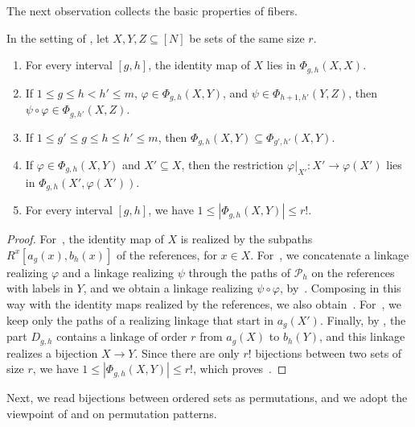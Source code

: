 \documentclass[fontsize=12pt,leading=14pt]{fullpaper}
\newcommand{\Pcal}{\mathcal{P}}
\begin{document}
The next observation collects the basic properties of fibers.

\begin{observation}\label{lem:s3-join-pairings}
  In the setting of , let $X,Y,Z\subseteq[N]$ be sets of the same size $r$.
  \begin{enumerate}[label=\textnormal{(\roman*)}]
    \item\label{item:s3-join-id} For every interval $[g,h]$, the identity map of $X$ lies in $\Phi_{g,h}(X,X)$.
    \item\label{item:s3-join-comp} If $1\le g\le h<h'\le m$, $\varphi\in\Phi_{g,h}(X,Y)$, and $\psi\in\Phi_{h+1,h'}(Y,Z)$, then $\psi\circ\varphi\in\Phi_{g,h'}(X,Z)$.
    \item\label{item:s3-join-ext} If $1\le g'\le g\le h\le h'\le m$, then $\Phi_{g,h}(X,Y)\subseteq\Phi_{g',h'}(X,Y)$.
    \item\label{item:s3-join-restr} If $\varphi\in\Phi_{g,h}(X,Y)$ and $X'\subseteq X$, then the restriction $\varphi|_{X'}\colon X'\to\varphi(X')$ lies in $\Phi_{g,h}(X',\varphi(X'))$.
    \item\label{item:s3-join-size} For every interval $[g,h]$, we have $1\le|\Phi_{g,h}(X,Y)|\le r!$.
  \end{enumerate}
\end{observation}

\begin{proof}
  For~, the identity map of $X$ is realized by the subpaths $R^x[a_g(x),b_h(x)]$ of the references, for $x\in X$.
  For~, we concatenate a linkage realizing $\varphi$ and a linkage realizing $\psi$ through the paths of $\Pcal_h$ on the references with labels in $Y$, and we obtain a linkage realizing $\psi\circ\varphi$, by~.
  Composing in this way with the identity maps realized by the references, we also obtain~.
  For~, we keep only the paths of a realizing linkage that start in $a_g(X')$.
  Finally, by , the part $D_{g,h}$ contains a linkage of order $r$ from $a_g(X)$ to $b_h(Y)$, and this linkage realizes a bijection $X\to Y$.
  Since there are only $r!$ bijections between two sets of size $r$, we have $1\le|\Phi_{g,h}(X,Y)|\le r!$, which proves~.
\end{proof}

Next, we read bijections between ordered sets as permutations, and we adopt the viewpoint of \textcite{AtkinsonBeals01} and \textcite{Lehtonen20} on permutation patterns.
\end{document}
